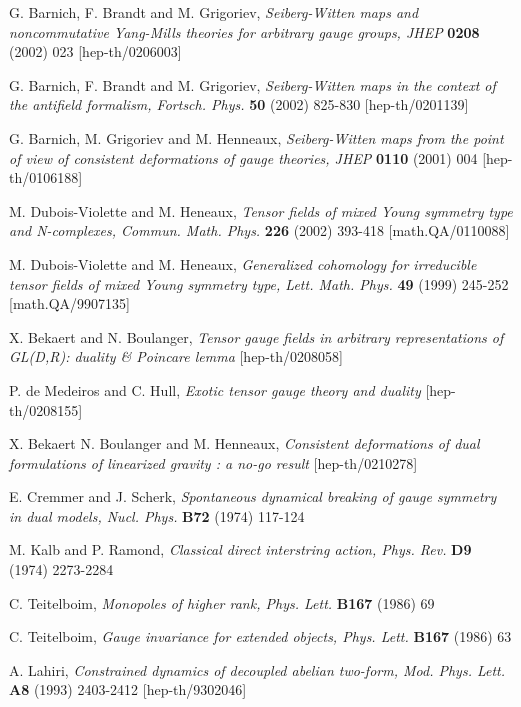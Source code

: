\documentclass[a4paper,12pt]{article}
\begin{document}
\begin{thebibliography}{99}
  G. Barnich, F. Brandt and M. Grigoriev, \textit{%
Seiberg-Witten maps and noncommutative Yang-Mills theories for arbitrary
gauge groups, JHEP} \textbf{0208} (2002) 023 [hep-th/0206003]

  G. Barnich, F. Brandt and M. Grigoriev, \textit{%
Seiberg-Witten maps in the context of the antifield formalism, Fortsch. Phys.%
} \textbf{50} (2002) 825-830 [hep-th/0201139]

  G. Barnich, M. Grigoriev and M. Henneaux, \textit{%
Seiberg-Witten maps from the point of view of consistent deformations of
gauge theories, JHEP} \textbf{0110} (2001) 004 [hep-th/0106188]

  M. Dubois-Violette and M. Heneaux, \textit{Tensor fields
of mixed Young symmetry type and N-complexes, Commun. Math. Phys.} \textbf{%
226} (2002) 393-418 [math.QA/0110088]

  M. Dubois-Violette and M. Heneaux, \textit{Generalized
cohomology for irreducible tensor fields of mixed Young symmetry type, Lett.
Math. Phys.} \textbf{49} (1999) 245-252 [math.QA/9907135]

  X. Bekaert and N. Boulanger, \textit{Tensor gauge fields
in arbitrary representations of GL(D,R): duality \& Poincare lemma}
[hep-th/0208058]

  P. de Medeiros and C. Hull, \textit{Exotic tensor gauge
theory and duality} [hep-th/0208155]

  X. Bekaert N. Boulanger and M. Henneaux, \textit{%
Consistent deformations of dual formulations of linearized gravity : a no-go
result} [hep-th/0210278]

  E. Cremmer and J. Scherk, \textit{Spontaneous dynamical
breaking of gauge symmetry in dual models, Nucl. Phys.} \textbf{B72} (1974)
117-124

  M. Kalb and P. Ramond, \textit{Classical direct
interstring action, Phys. Rev.} \textbf{D9} (1974) 2273-2284

  C. Teitelboim, \textit{Monopoles of higher rank, Phys.
Lett.} \textbf{B167} (1986) 69

  C. Teitelboim, \textit{Gauge invariance for extended
objects, Phys. Lett.} \textbf{B167} (1986) 63

  A. Lahiri, \textit{Constrained dynamics of decoupled
abelian two-form, Mod. Phys. Lett.} \textbf{A8} (1993) 2403-2412
[hep-th/9302046]


\end{thebibliography}
\end{document}
